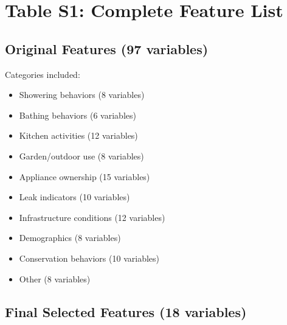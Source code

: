\documentclass[a4paper,12pt]{article}
\begin{document}
\newpage
\section{Table S1: Complete Feature List}

\subsection{Original Features (97 variables)}
Categories included:
\begin{itemize}
    \item Showering behaviors (8 variables)
    \item Bathing behaviors (6 variables)
    \item Kitchen activities (12 variables)
    \item Garden/outdoor use (8 variables)
    \item Appliance ownership (15 variables)
    \item Leak indicators (10 variables)
    \item Infrastructure conditions (12 variables)
    \item Demographics (8 variables)
    \item Conservation behaviors (10 variables)
    \item Other (8 variables)
\end{itemize}

\subsection{Final Selected Features (18 variables)}
\end{document}
